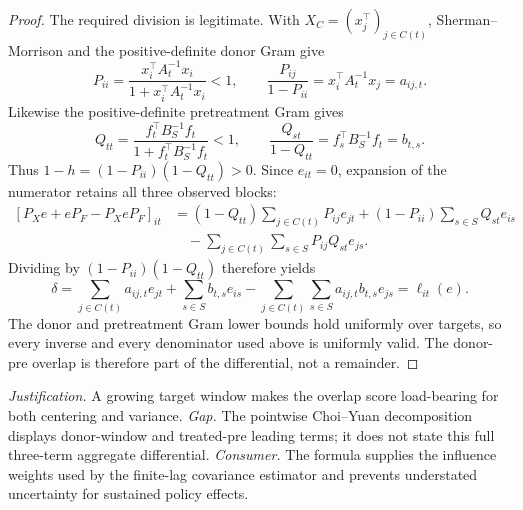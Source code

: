 \documentclass{article}
\begin{document}
\begin{proof}
The required division is legitimate.  With \(X_C=(x_j^{\top})_{j\in C(t)}\), Sherman--Morrison and the positive-definite donor Gram give
\[
 P_{ii}=\frac{x_i^{\top}A_t^{-1}x_i}{1+x_i^{\top}A_t^{-1}x_i}<1,
 \qquad
 \frac{P_{ij}}{1-P_{ii}}=x_i^{\top}A_t^{-1}x_j=a_{ij,t}.
\]
Likewise the positive-definite pretreatment Gram gives
\[
 Q_{tt}=\frac{f_t^{\top}B_S^{-1}f_t}{1+f_t^{\top}B_S^{-1}f_t}<1,
 \qquad
 \frac{Q_{st}}{1-Q_{tt}}=f_s^{\top}B_S^{-1}f_t=b_{t,s}.
\]
Thus \(1-h=(1-P_{ii})(1-Q_{tt})>0\).  Since \(e_{it}=0\), expansion of the numerator retains all three observed blocks:
\[
 \begin{aligned}
 [P_Xe+eP_F-P_XeP_F]_{it}
 &=(1-Q_{tt})\sum_{j\in C(t)}P_{ij}e_{jt}
 +(1-P_{ii})\sum_{s\in S}Q_{st}e_{is}\\
 &\quad-\sum_{j\in C(t)}\sum_{s\in S}P_{ij}Q_{st}e_{js}.
 \end{aligned}
\]
Dividing by \((1-P_{ii})(1-Q_{tt})\) therefore yields
\[
 \delta
 =\sum_{j\in C(t)}a_{ij,t}e_{jt}
 +\sum_{s\in S}b_{t,s}e_{is}
 -\sum_{j\in C(t)}\sum_{s\in S}a_{ij,t}b_{t,s}e_{js}
 =\ell_{it}(e).
\]
The donor and pretreatment Gram lower bounds hold uniformly over targets, so every inverse and every denominator used above is uniformly valid.  The donor-pre overlap is therefore part of the differential, not a remainder.
\end{proof}
\par\smallskip\noindent \textit{Justification.} A growing target window makes the overlap score load-bearing for both centering and variance. \textit{Gap.} The pointwise Choi--Yuan decomposition displays donor-window and treated-pre leading terms; it does not state this full three-term aggregate differential. \textit{Consumer.} The formula supplies the influence weights used by the finite-lag covariance estimator and prevents understated uncertainty for sustained policy effects.
\end{document}
